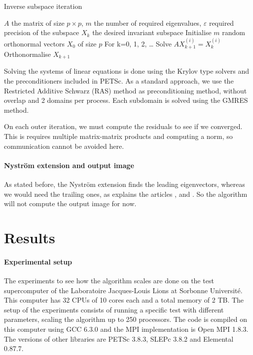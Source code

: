 \begin{algorithm}[H]
 \caption{Inverse subspace iteration}
 \begin{algorithmic}
  \REQUIRE \(A\) the matrix of size \(p \times p\), \(m\) the number of required eigenvalues, \(\varepsilon\) required precision of the subspace
  \ENSURE \(X_k\) the desired invariant subspace
  \STATE Initialise \(m\) random orthonormal vectors \(X_0\) of size \(p\)
  \STATE For k=0, 1, 2, \dots
    \STATE Solve \(A X_{k+1}^{(i)} = X_k^{(i)}\)
   \ENDFOR
   \STATE Orthonormalise \(X_{k+1}\)
  \ENDWHILE
 \end{algorithmic}
\end{algorithm}

Solving the systems of linear equations is done using the Krylov type solvers and the preconditioners included in PETSc.
As a standard approach, we use the Restricted Additive Schwarz (RAS) method as preconditioning method, without overlap and 2 domains per process.
Each subdomain is solved using the GMRES method.

On each outer iteration, we must compute the residuals to see if we converged.
This is requires multiple matrix-matrix products and computing a norm, so communication cannot be avoided here.

\paragraph{Nystr\"om extension and output image}
As stated before, the Nystr\"om extension finds the leading eigenvectors, whereas we would need the trailing ones, as explains the articles \cite{belongie_spectral_2002}, \cite{fowlkes_spectral_2004} and \cite{glide_2014}.
So the algorithm will not compute the output image for now.

\section{Results}

\paragraph{Experimental setup}
The experiments to see how the algorithm scales are done on the test supercomputer of the Laboratoire Jacques-Louis Lions at Sorbonne Université.
This computer has 32 CPUs of 10 cores each and a total memory of 2 TB.
The setup of the experiments consists of running a specific test with different parameters, scaling the algorithm up to 250 processors.
The code is compiled on this computer using GCC 6.3.0 and the MPI implementation is Open MPI 1.8.3.
The versions of other libraries are PETSc 3.8.3, SLEPc 3.8.2 and Elemental 0.87.7.

